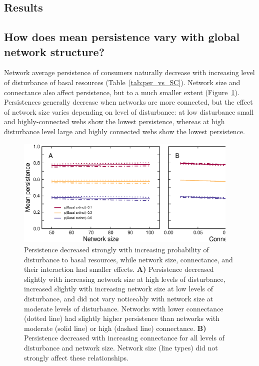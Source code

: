 \documentclass[12pt]{article}
\begin{document}
\begin{spacing}{2.0}
\section*{Results}

    \subsection*{How does mean persistence vary with global network structure?}
    
        Network average persistence of consumers naturally decrease with increasing level of disturbance of basal resources (Table~\ref{tab:per_vs_SC}). Network size and connectance also affect persistence, but to a much smaller extent (Figure~\ref{fig:lm_CS}). Persistences generally decrease when networks are more connected, but the effect of network size varies depending on level of disturbance: at low disturbance small and highly-connected webs show the lowest persistence, whereas at high disturbance level large and highly connected webs show the lowest persistence.

        \begin{figure}[h!]
            \centering
            \includegraphics[width=0.95\textwidth]{figures/persistence_vs_SC_lm.eps}
            \caption{Persistence decreased strongly with increasing probability of disturbance to basal resources, while network size, connectance, and their interaction had smaller effects. \textbf{A)} Persistence decreased slightly with increasing network size at high levels of disturbance, increased slightly with increasing network size at low levels of disturbance, and did not vary noticeably with network size at moderate levels of disturbance. Networks with lower connectance (dotted line) had slightly higher persistence than networks with moderate (solid line) or high (dashed line) connectance.
            \textbf{B)} Persistence decreased with increasing connectance for all levels of disturbance and network size. Network size (line types) did not strongly affect these relationships.}
            \label{fig:lm_CS}
        \end{figure}



\end{spacing}
\end{document}

